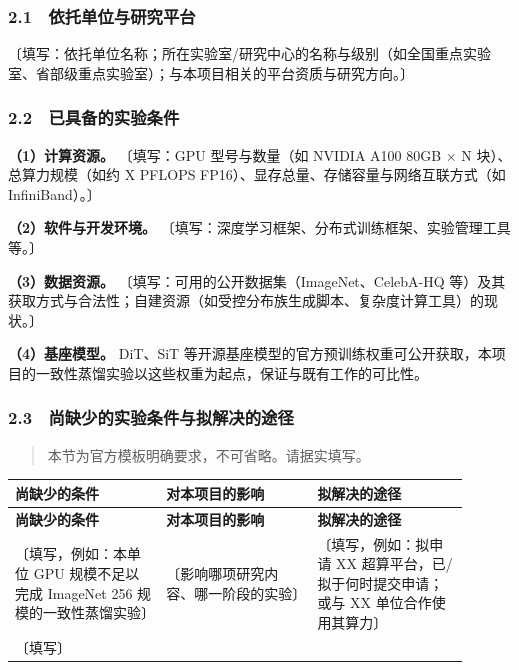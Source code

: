 \documentclass[12pt,a4paper]{ctexart}
\begin{document}
\subsubsection*{2.1　依托单位与研究平台}

〔填写：依托单位名称；所在实验室/研究中心的名称与级别（如全国重点实验室、省部级重点实验室）；与本项目相关的平台资质与研究方向。〕

\subsubsection*{2.2　已具备的实验条件}

\textbf{（1）计算资源。} 〔填写：GPU 型号与数量（如 NVIDIA A100 80GB × N 块）、总算力规模（如约 X PFLOPS FP16）、显存总量、存储容量与网络互联方式（如 InfiniBand）。〕

\textbf{（2）软件与开发环境。} 〔填写：深度学习框架、分布式训练框架、实验管理工具等。〕

\textbf{（3）数据资源。} 〔填写：可用的公开数据集（ImageNet、CelebA-HQ 等）及其获取方式与合法性；自建资源（如受控分布族生成脚本、复杂度计算工具）的现状。〕

\textbf{（4）基座模型。} DiT、SiT 等开源基座模型的官方预训练权重可公开获取，本项目的一致性蒸馏实验以这些权重为起点，保证与既有工作的可比性。

\subsubsection*{2.3　尚缺少的实验条件与拟解决的途径}

\begin{quote}\small
本节为官方模板明确要求，不可省略。请据实填写。

\end{quote}

\begin{longtable}{|>{\raggedright\arraybackslash}p{0.300\linewidth}|>{\raggedright\arraybackslash}p{0.300\linewidth}|>{\raggedright\arraybackslash}p{0.300\linewidth}|}
\hline
\textbf{尚缺少的条件} & \textbf{对本项目的影响} & \textbf{拟解决的途径} \\
\hline
\endfirsthead
\hline
\textbf{尚缺少的条件} & \textbf{对本项目的影响} & \textbf{拟解决的途径} \\
\hline
\endhead
〔填写，例如：本单位 GPU 规模不足以完成 ImageNet 256 规模的一致性蒸馏实验〕 & 〔影响哪项研究内容、哪一阶段的实验〕 & 〔填写，例如：拟申请 XX 超算平台，已/拟于何时提交申请；或与 XX 单位合作使用其算力〕 \\
\hline
〔填写〕 &  &  \\
\hline
\end{longtable}
\end{document}
